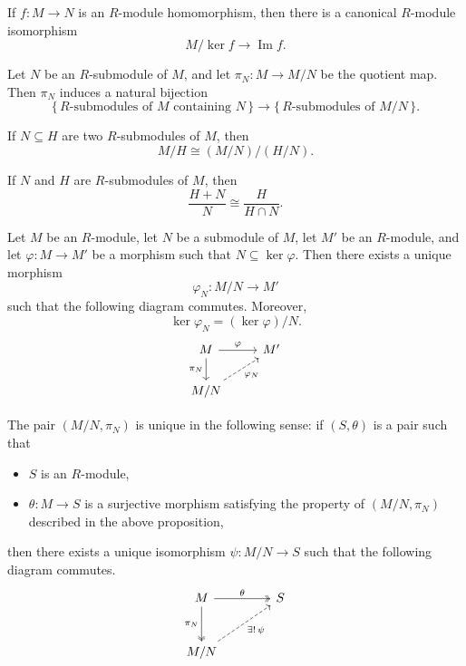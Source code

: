 \begin{theorem}
    If $f\colon M \to N$ is an $R$-module homomorphism, then there is a canonical $R$-module isomorphism
    \[
        M / \ker f \to \operatorname{Im} f.
    \]
\end{theorem}

\begin{theorem}
    Let $N$ be an $R$-submodule of $M$, and let $\pi_N\colon M \to M/N$ be the quotient map. Then $\pi_N$ induces a natural bijection
    \[
        \{\, \text{$R$-submodules of $M$ containing $N$} \,\}
        \to
        \{\, \text{$R$-submodules of $M/N$} \,\}.
    \]
\end{theorem}

\begin{theorem}
    If $N \subseteq H$ are two $R$-submodules of $M$, then
    \[
        M/H \cong (M/N)/(H/N).
    \]
\end{theorem}

\begin{theorem}
    If $N$ and $H$ are $R$-submodules of $M$, then
    \[
        \frac{H+N}{N} \cong \frac{H}{H \cap N}.
    \]
\end{theorem}

\begin{proposition}
    Let $M$ be an $R$-module, let $N$ be a submodule of $M$, let $M'$ be an $R$-module, and let $\varphi\colon M \to M'$ be a morphism such that $N \subseteq \ker \varphi$. Then there exists a unique morphism
    \[
        \varphi_N\colon M/N \to M'
    \]
    such that the following diagram commutes. Moreover,
    \[
        \ker \varphi_N = (\ker \varphi)/N.
    \]
    \[
        \begin{tikzcd}
            M \arrow[r, "\varphi"] \arrow[d, "\pi_{N}"'] & M' \\
            M/N \arrow[ru, "\varphi_N"', dashed]
        \end{tikzcd}
    \]
\end{proposition}

\begin{remark}
    The pair $(M/N, \pi_{N})$ is unique in the following sense: if $(S, \theta)$ is a pair such that
    \begin{itemize}
        \item $S$ is an $R$-module,
        \item $\theta: M \to S$ is a surjective morphism satisfying the property of $(M/N, \pi_{N})$ described in the above proposition,
    \end{itemize}
    then there exists a unique isomorphism $\psi: M/N \to S$ such that the following diagram commutes.
    \[
        \begin{tikzcd}[row sep=2.8em, column sep=3.8em]
            M \arrow[r, two heads, "\theta"] \arrow[d, two heads, "\pi_{N}"'] & S \\
            M/N \arrow[ur, dashed, "\exists!\,\psi"'] &
        \end{tikzcd}
    \]
\end{remark}

